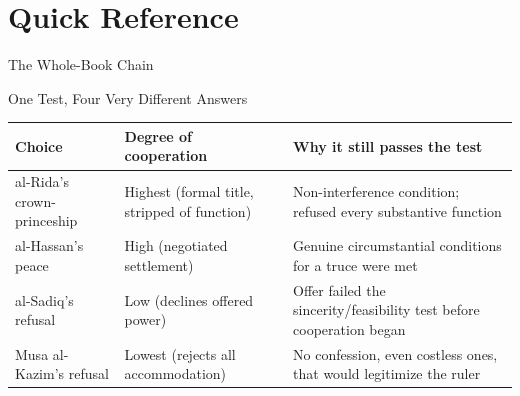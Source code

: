 \section{Quick Reference}

\begin{frame}{The Whole-Book Chain}
\begin{center}
\end{center}
\end{frame}

\begin{frame}{One Test, Four Very Different Answers}
\centering\scriptsize
\renewcommand{\arraystretch}{1.4}
\begin{tabular}{|p{3.4cm}|p{3.1cm}|p{3.6cm}|}
\hline
\textbf{Choice} & \textbf{Degree of cooperation} & \textbf{Why it still passes the test} \\\hline
al-Rida's crown-princeship & Highest (formal title, stripped of function) & Non-interference condition; refused every substantive function \\\hline
al-Hassan's peace & High (negotiated settlement) & Genuine circumstantial conditions for a truce were met \\\hline
al-Sadiq's refusal & Low (declines offered power) & Offer failed the sincerity/feasibility test before cooperation began \\\hline
Musa al-Kazim's refusal & Lowest (rejects all accommodation) & No confession, even costless ones, that would legitimize the ruler \\\hline
\end{tabular}
\vspace{0.3cm}
\begin{center}
\Large{}
\end{center}
\end{frame}

